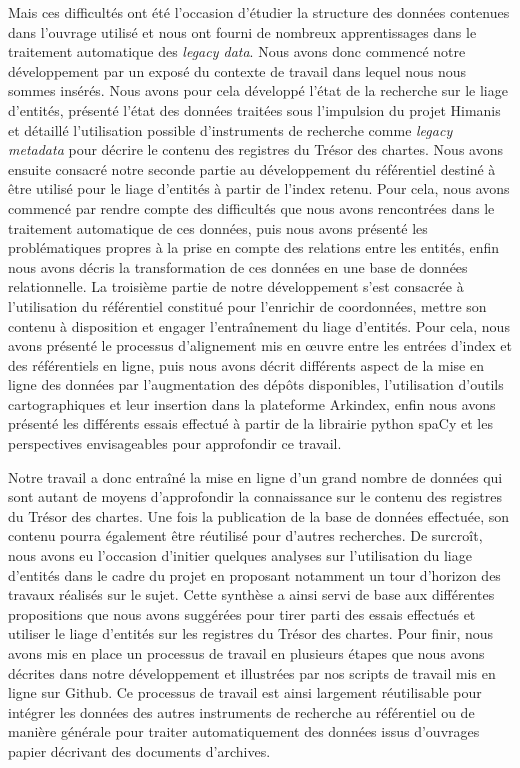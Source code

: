 \documentclass[a4paper,12pt,twoside]{book}
\begin{document}
	Mais ces difficultés ont été l'occasion d'étudier la structure des données contenues dans l'ouvrage utilisé et nous ont fourni de nombreux apprentissages dans le traitement automatique des \textit{legacy data}. Nous avons donc commencé notre développement par un exposé du contexte de travail dans lequel nous nous sommes insérés. Nous avons pour cela développé l'état de la recherche sur le liage d'entités, présenté l'état des données traitées sous l'impulsion du projet Himanis et détaillé l'utilisation possible d'instruments de recherche comme \textit{legacy metadata} pour décrire le contenu des registres du Trésor des chartes. Nous avons ensuite consacré notre seconde partie au développement du référentiel destiné à être utilisé pour le liage d'entités à partir de l'index retenu. Pour cela, nous avons commencé par rendre compte des difficultés que nous avons rencontrées dans le traitement automatique de ces données, puis nous avons présenté les problématiques propres à la prise en compte des relations entre les entités, enfin nous avons décris la transformation de ces données en une base de données relationnelle. La troisième partie de notre développement s'est consacrée à l'utilisation du référentiel constitué pour l'enrichir de coordonnées, mettre son contenu à disposition et engager l'entraînement du liage d'entités. Pour cela, nous avons présenté le processus d'alignement mis en œuvre entre les entrées d'index et des référentiels en ligne, puis nous avons décrit différents aspect de la mise en ligne des données par l'augmentation des dépôts disponibles, l'utilisation d'outils cartographiques et leur insertion dans la plateforme Arkindex, enfin nous avons présenté les différents essais effectué à partir de la librairie python spaCy et les perspectives envisageables pour approfondir ce travail.
	
	Notre travail a donc entraîné la mise en ligne d'un grand nombre de données qui sont autant de moyens d'approfondir la connaissance sur le contenu des registres du Trésor des chartes. Une fois la publication de la base de données effectuée, son contenu pourra également être réutilisé pour d'autres recherches. De surcroît, nous avons eu l'occasion d'initier quelques analyses sur l'utilisation du liage d'entités dans le cadre du projet en proposant notamment un tour d'horizon des travaux réalisés sur le sujet. Cette synthèse a ainsi servi de base aux différentes propositions que nous avons suggérées pour tirer parti des essais effectués et utiliser le liage d'entités sur les registres du Trésor des chartes. Pour finir, nous avons mis en place un processus de travail en plusieurs étapes que nous avons décrites dans notre développement et illustrées par nos scripts de travail mis en ligne sur Github. Ce processus de travail est ainsi largement réutilisable pour intégrer les données des autres instruments de recherche au référentiel ou de manière générale pour traiter automatiquement des données issus d'ouvrages papier décrivant des documents d'archives.
	
\end{document}
